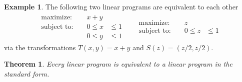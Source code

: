 \documentclass[
]{book}
\newtheorem{theorem}{Theorem}[chapter]
\theoremstyle{definition}
\theoremstyle{definition}
\newtheorem{example}{Example}[chapter]
\theoremstyle{definition}
\theoremstyle{definition}
\theoremstyle{remark}
\begin{document}
\begin{example}
The following two linear programs are equivalent to each other
\begin{align*}
\begin{aligned}
  \mbox{maximize: } && x + y & \\
  \mbox{subject to: } && 0 \le x &\le 1 \\
     && 0 \le y &\le 1 
\end{aligned}
&&
\begin{aligned}
  \mbox{maximize: } && z & \\
  \mbox{subject to: } && 0 \le z &\le 1
\end{aligned}
\end{align*}
via the transformations \(T(x, y) = x + y\) and \(S(z) = (z/2, z/2)\).
\end{example}

\begin{theorem}
\protect\hypertarget{thm:lp-to-standard-form}{}\label{thm:lp-to-standard-form}Every linear program is equivalent to a linear program in the standard form.
\end{theorem}
\end{document}
